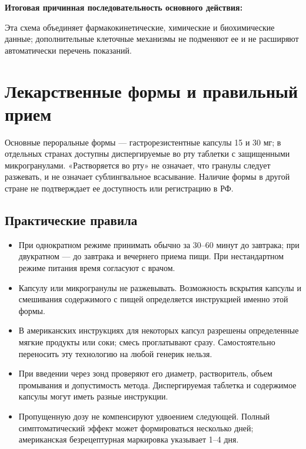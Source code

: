 \documentclass[11pt,a4paper,notitlepage]{report}
\newcommand{\src}[1]{\unskip\space\cite{#1}}
\begin{document}
\textbf{Итоговая причинная последовательность основного действия:}
\begin{center}
\end{center}
Эта схема объединяет фармакокинетические, химические и биохимические данные; дополнительные клеточные механизмы не подменяют ее и не расширяют автоматически перечень показаний.\src{pharmalabel,molnagaya89,molnagaya90}

\section{Лекарственные формы и правильный прием}
\label{sec:formulations}

Основные пероральные формы --- гастрорезистентные капсулы 15 и 30 мг; в отдельных странах доступны диспергируемые во рту таблетки с защищенными микрогранулами. «Растворяется во рту» не означает, что гранулы следует разжевать, и не означает сублингвальное всасывание. Наличие формы в другой стране не подтверждает ее доступность или регистрацию в РФ.\src{uslabel,emc}

\subsection{Практические правила}
\begin{itemize}
\item При однократном режиме принимать обычно за 30--60 минут до завтрака; при двукратном --- до завтрака и вечернего приема пищи. При нестандартном режиме питания время согласуют с врачом.\src{acggerd}
\item Капсулу или микрогранулы не разжевывать. Возможность вскрытия капсулы и смешивания содержимого с пищей определяется инструкцией именно этой формы.\src{uslabel}
\item В американских инструкциях для некоторых капсул разрешены определенные мягкие продукты или соки; смесь проглатывают сразу. Самостоятельно переносить эту технологию на любой генерик нельзя.\src{uslabel}
\item При введении через зонд проверяют его диаметр, растворитель, объем промывания и допустимость метода. Диспергируемая таблетка и содержимое капсулы могут иметь разные инструкции.\src{emc,uslabel}
\item Пропущенную дозу не компенсируют удвоением следующей. Полный симптоматический эффект может формироваться несколько дней; американская безрецептурная маркировка указывает 1--4 дня.\src{otc,uslabel}
\end{itemize}
\end{document}
